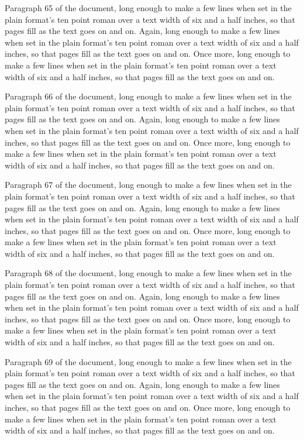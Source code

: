 Paragraph 65 of the document, long enough to make a few lines when set in the plain format's ten point roman over a text width of six and a half inches, so that pages fill as the text goes on and on. Again, long enough to make a few lines when set in the plain format's ten point roman over a text width of six and a half inches, so that pages fill as the text goes on and on. Once more, long enough to make a few lines when set in the plain format's ten point roman over a text width of six and a half inches, so that pages fill as the text goes on and on.

Paragraph 66 of the document, long enough to make a few lines when set in the plain format's ten point roman over a text width of six and a half inches, so that pages fill as the text goes on and on. Again, long enough to make a few lines when set in the plain format's ten point roman over a text width of six and a half inches, so that pages fill as the text goes on and on. Once more, long enough to make a few lines when set in the plain format's ten point roman over a text width of six and a half inches, so that pages fill as the text goes on and on.

Paragraph 67 of the document, long enough to make a few lines when set in the plain format's ten point roman over a text width of six and a half inches, so that pages fill as the text goes on and on. Again, long enough to make a few lines when set in the plain format's ten point roman over a text width of six and a half inches, so that pages fill as the text goes on and on. Once more, long enough to make a few lines when set in the plain format's ten point roman over a text width of six and a half inches, so that pages fill as the text goes on and on.

Paragraph 68 of the document, long enough to make a few lines when set in the plain format's ten point roman over a text width of six and a half inches, so that pages fill as the text goes on and on. Again, long enough to make a few lines when set in the plain format's ten point roman over a text width of six and a half inches, so that pages fill as the text goes on and on. Once more, long enough to make a few lines when set in the plain format's ten point roman over a text width of six and a half inches, so that pages fill as the text goes on and on.

Paragraph 69 of the document, long enough to make a few lines when set in the plain format's ten point roman over a text width of six and a half inches, so that pages fill as the text goes on and on. Again, long enough to make a few lines when set in the plain format's ten point roman over a text width of six and a half inches, so that pages fill as the text goes on and on. Once more, long enough to make a few lines when set in the plain format's ten point roman over a text width of six and a half inches, so that pages fill as the text goes on and on.

